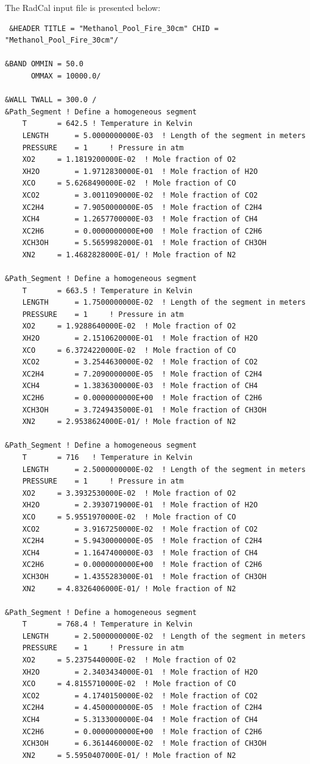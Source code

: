 The RadCal input file is presented below:

 \begin{lstlisting}
 &HEADER TITLE = "Methanol_Pool_Fire_30cm" CHID = "Methanol_Pool_Fire_30cm"/

&BAND OMMIN = 50.0
      OMMAX = 10000.0/

&WALL TWALL = 300.0 /
&Path_Segment ! Define a homogeneous segment
	T		= 642.5	! Temperature in Kelvin
	LENGTH		= 5.0000000000E-03	! Length of the segment in meters
	PRESSURE	= 1		! Pressure in atm
	XO2		= 1.1819200000E-02	! Mole fraction of O2
	XH2O		= 1.9712830000E-01	! Mole fraction of H2O
	XCO		= 5.6268490000E-02	! Mole fraction of CO
	XCO2		= 3.0011090000E-02	! Mole fraction of CO2
	XC2H4		= 7.9050000000E-05	! Mole fraction of C2H4
	XCH4		= 1.2657700000E-03	! Mole fraction of CH4
	XC2H6		= 0.0000000000E+00	! Mole fraction of C2H6
	XCH3OH		= 5.5659982000E-01	! Mole fraction of CH3OH
	XN2		= 1.4682828000E-01/	! Mole fraction of N2

&Path_Segment ! Define a homogeneous segment
	T		= 663.5	! Temperature in Kelvin
	LENGTH		= 1.7500000000E-02	! Length of the segment in meters
	PRESSURE	= 1		! Pressure in atm
	XO2		= 1.9288640000E-02	! Mole fraction of O2
	XH2O		= 2.1510620000E-01	! Mole fraction of H2O
	XCO		= 6.3724220000E-02	! Mole fraction of CO
	XCO2		= 3.2544630000E-02	! Mole fraction of CO2
	XC2H4		= 7.2090000000E-05	! Mole fraction of C2H4
	XCH4		= 1.3836300000E-03	! Mole fraction of CH4
	XC2H6		= 0.0000000000E+00	! Mole fraction of C2H6
	XCH3OH		= 3.7249435000E-01	! Mole fraction of CH3OH
	XN2		= 2.9538624000E-01/	! Mole fraction of N2

&Path_Segment ! Define a homogeneous segment
	T		= 716	! Temperature in Kelvin
	LENGTH		= 2.5000000000E-02	! Length of the segment in meters
	PRESSURE	= 1		! Pressure in atm
	XO2		= 3.3932530000E-02	! Mole fraction of O2
	XH2O		= 2.3930719000E-01	! Mole fraction of H2O
	XCO		= 5.9551970000E-02	! Mole fraction of CO
	XCO2		= 3.9167250000E-02	! Mole fraction of CO2
	XC2H4		= 5.9430000000E-05	! Mole fraction of C2H4
	XCH4		= 1.1647400000E-03	! Mole fraction of CH4
	XC2H6		= 0.0000000000E+00	! Mole fraction of C2H6
	XCH3OH		= 1.4355283000E-01	! Mole fraction of CH3OH
	XN2		= 4.8326406000E-01/	! Mole fraction of N2

&Path_Segment ! Define a homogeneous segment
	T		= 768.4	! Temperature in Kelvin
	LENGTH		= 2.5000000000E-02	! Length of the segment in meters
	PRESSURE	= 1		! Pressure in atm
	XO2		= 5.2375440000E-02	! Mole fraction of O2
	XH2O		= 2.3403434000E-01	! Mole fraction of H2O
	XCO		= 4.8155710000E-02	! Mole fraction of CO
	XCO2		= 4.1740150000E-02	! Mole fraction of CO2
	XC2H4		= 4.4500000000E-05	! Mole fraction of C2H4
	XCH4		= 5.3133000000E-04	! Mole fraction of CH4
	XC2H6		= 0.0000000000E+00	! Mole fraction of C2H6
	XCH3OH		= 6.3614460000E-02	! Mole fraction of CH3OH
	XN2		= 5.5950407000E-01/	! Mole fraction of N2


\end{lstlisting}
